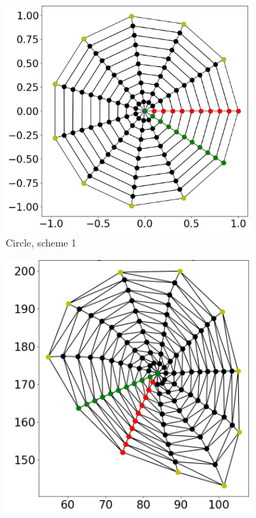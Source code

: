 \begin{figure}
  \begin{subfigure}[t]{0.24\textwidth}%
    \centering%
    \includegraphics[width=\textwidth]{images/fiber_creation/quad_0.png}%
    \caption{Circle, scheme 1}%
    \label{fig:tquad_0}%
  \end{subfigure}
  \begin{subfigure}[t]{0.24\textwidth}%
    \centering%
    \includegraphics[width=\textwidth, trim=26mm 14mm 6mm 6mm, clip]{images/fiber_creation/mesh_plots/out_0_0_0_w.png}%

\end{subfigure}
\end{figure}
